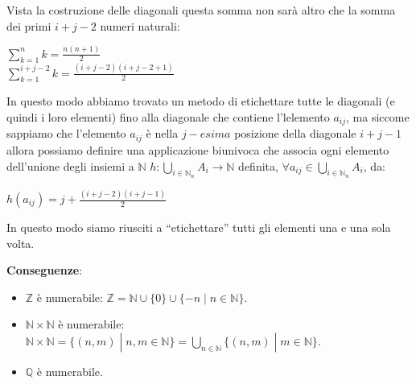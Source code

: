 Vista la costruzione delle diagonali questa somma non sarà altro che la somma dei primi $i + j - 2$ numeri naturali:
\begin{center}
    $\sum_{k=1}^{n} k = \frac{n(n + 1)}{2} \;$ \\
    $\sum_{k=1}^{i + j - 2} k = \frac{(i + j - 2)(i + j - 2 + 1)}{2}$ 
\end{center}
In questo modo abbiamo trovato un metodo di etichettare tutte le diagonali (e quindi i loro elementi) fino alla diagonale che contiene l'lelemento $a_{ij}$, ma siccome sappiamo che l'elemento $a_{ij}$ è nella $j-esima$ posizione della diagonale $i+j-1$ allora possiamo definire una applicazione biunivoca che associa ogni elemento dell'unione degli insiemi a $\mathbb{N}$ $h : \bigcup_{i \in \mathbb{N}_n}A_i \rightarrow \mathbb{N}$ definita, $\forall a_{ij} \in \bigcup_{i \in \mathbb{N}_n} A_i$, da:
\begin{center}
    $h(a_{ij}) = j + \frac{(i + j - 2)(i + j - 1)}{2}$
\end{center}
In questo modo siamo riusciti a ``etichettare'' tutti gli elementi una e una sola volta.

\textbf{Conseguenze}:
\begin{itemize}
    \item $\mathbb{Z}$ è numerabile: $\mathbb{Z} = \mathbb{N} \cup \{0\} \cup \{ -n \; | \; n \in \mathbb{N}\}$.
    \item $\mathbb{N} \times \mathbb{N}$ è numerabile: $\mathbb{N} \times \mathbb{N} = \{(n, m) \; | \; n, m \in \mathbb{N}\} = \bigcup_{n \in \mathbb{N}} \{(n, m) \; | \; m \in \mathbb{N}\}$.
    \item $\mathbb{Q}$ è numerabile.
\end{itemize}

\newpage
